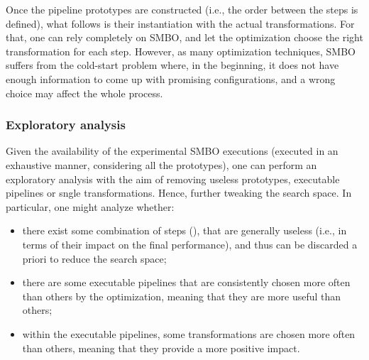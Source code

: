 Once the pipeline prototypes are constructed (i.e., the order between the steps is defined), what follows is their instantiation with the actual transformations.
For that, one can rely completely on SMBO, and let the optimization choose the right transformation for each step.
However, as many optimization techniques, SMBO suffers from the cold-start problem where, in the beginning, it does not have enough information to come up with promising configurations, and a wrong choice may affect the whole process.

\subsubsection{Exploratory analysis}
Given the availability of the experimental SMBO executions (executed in an exhaustive manner, considering all the prototypes), one can perform an exploratory analysis with the aim of removing useless prototypes, executable pipelines or sngle transformations.
Hence, further tweaking the search space.
In particular, one might analyze whether:

\begin{itemize}
    \item there exist some combination of steps (), that are generally useless (i.e., in terms of their impact on the final performance), and thus can be discarded a priori to reduce the search space;
    \item there are some executable pipelines that are consistently chosen more often than others by the optimization, meaning that they are more useful than others;
    \item within the executable pipelines, some transformations are chosen more often than others, meaning that they provide a more positive impact.
    \end{itemize}

